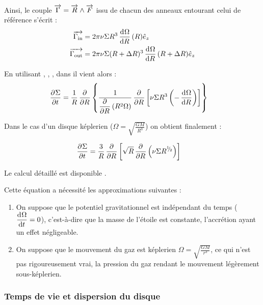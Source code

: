 \bigskip

Ainsi, le couple ${\overrightarrow{\Gamma}}={\overrightarrow{R}}\wedge{\overrightarrow{F}}$ issu de chacun des anneaux entourant celui de référence s'écrit :
\begin{subequations}
\begin{align}
{\overrightarrow{\Gamma_\text{in}}} &= 2\pi\nu \Sigma R^3 \mathinner{ \dfrac{\operatorname{d \!}{^{}}\Omega}{\operatorname{d \!}{{R}^{}}} }(R) \hat{e}_z\label{eq:G_in}\\
{\overrightarrow{\Gamma_\text{out}}} &= 2\pi\nu \Sigma (R+\Delta R)^3 \mathinner{ \dfrac{\operatorname{d \!}{^{}}\Omega}{\operatorname{d \!}{{R}^{}}} }(R+\Delta R) \hat{e}_z\label{eq:G_out}
\end{align}\label{eq:J_torques}
\end{subequations}

\bigskip

En utilisant , , , dans  il vient alors :
\begin{align}
\mathinner{ \dfrac{\partial{^{}}\Sigma}{\partial{{t}^{}}} } &= \frac{1}{R}\mathinner{ \dfrac{\partial{^{}}}{\partial{{R}^{}}} }\left\{\frac{1}{\mathinner{ \dfrac{\partial{^{}}}{\partial{{R}^{}}} }\left(R^2\Omega\right)} \mathinner{ \dfrac{\partial{^{}}}{\partial{{R}^{}}} }\left[\nu \Sigma R^3 \left(-\mathinner{ \dfrac{\operatorname{d \!}{^{}}\Omega}{\operatorname{d \!}{{R}^{}}} }\right)\right]\right\}
\end{align}

Dans le cas d'un disque képlerien ($\Omega = \sqrt{\frac{GM}{R^3}}$) on obtient finalement :
\begin{important}
\begin{align}
\mathinner{ \dfrac{\partial{^{}}\Sigma}{\partial{{t}^{}}} } &=\frac{3}{R}\mathinner{ \dfrac{\partial{^{}}}{\partial{{R}^{}}} }\left[\sqrt{R} \mathinner{ \dfrac{\partial{^{}}}{\partial{{R}^{}}} }\left(\nu \Sigma R^{{}^{1\!\!}/ _{\!2}}\right)\right]
\end{align}
\end{important}

Le calcul détaillé est disponible .

Cette équation a nécessité les approximations suivantes : 
\begin{enumerate}
\item On suppose que le potentiel gravitationnel est indépendant du temps ($\mathinner{ \dfrac{\operatorname{d \!}{^{}}\Omega}{\operatorname{d \!}{{t}^{}}} }=0$), c'est-à-dire que la masse de l'étoile est constante, l'accrétion ayant un effet négligeable.
\item On suppose que le mouvement du gaz est képlerien $\Omega=\sqrt{\frac{GM}{r^3}}$, ce qui n'est pas rigoureusement vrai, la pression du gaz rendant le mouvement légèrement sous-képlerien.
\end{enumerate}

\subsubsection{Temps de vie et dispersion du disque}\label{sec:dispersion}

